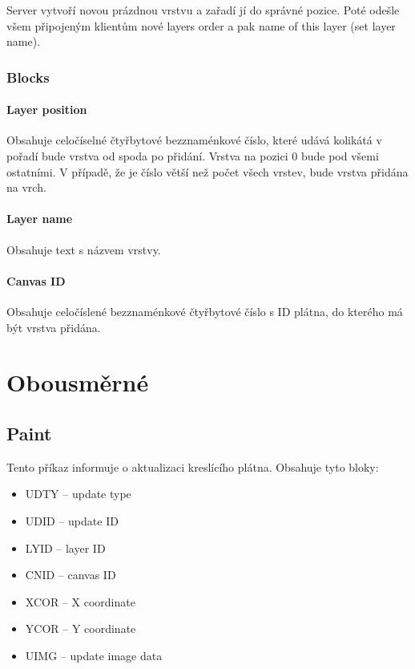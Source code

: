 \documentclass[12pt,oneside,a4paper]{report}
\begin{document}
Server vytvoří novou prázdnou vrstvu a zařadí jí do správné pozice. Poté odešle všem připojeným klientům nové layers order a pak name of this layer (set layer name).

\subsubsection{Blocks}

\paragraph{Layer position}

Obsahuje celočíselné čtyřbytové bezznaménkové číslo, které udává kolikátá v pořadí bude vrstva od spoda po přidání. Vrstva na pozici $0$ bude pod všemi ostatními. V případě, že je číslo větší než počet všech vrstev, bude vrstva přidána na vrch.

\paragraph{Layer name}

Obsahuje text s názvem vrstvy.

\paragraph{Canvas ID}

Obsahuje celočíslené bezznaménkové čtyřbytové číslo s ID plátna, do kterého má být vrstva přidána.

\section{Obousměrné}

\subsection{Paint}

Tento příkaz informuje o aktualizaci kreslícího plátna. Obsahuje tyto bloky:

\begin{itemize}
	\item UDTY -- update type
	\item UDID -- update ID
	\item LYID -- layer ID
	\item CNID -- canvas ID
	\item XCOR -- X coordinate
	\item YCOR -- Y coordinate
	\item UIMG -- update image data				
\end{itemize}
\end{document}
